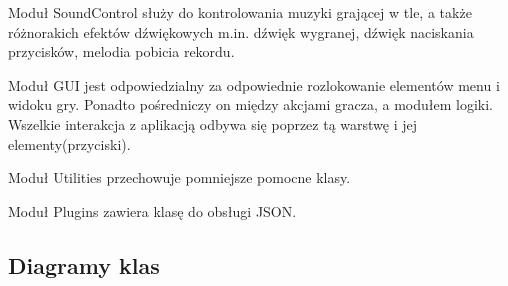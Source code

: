 \documentclass[a4paper, 11pt]{article}
\begin{document}
Moduł SoundControl służy do kontrolowania muzyki grającej w tle, a także różnorakich efektów dźwiękowych m.in. dźwięk wygranej, dźwięk naciskania przycisków, melodia pobicia rekordu.


Moduł GUI jest odpowiedzialny za odpowiednie rozlokowanie elementów menu i widoku gry. Ponadto pośredniczy on między akcjami gracza, a modułem logiki. Wszelkie interakcja z aplikacją odbywa się poprzez tą warstwę i jej elementy(przyciski).


Moduł Utilities przechowuje pomniejsze pomocne klasy.

Moduł Plugins zawiera klasę do obsługi JSON.
\subsection{Diagramy klas}
\end{document}
